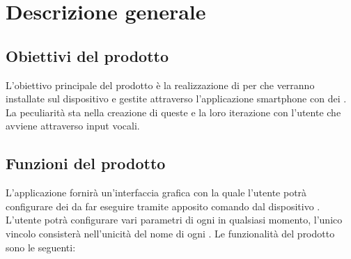 \clearpage
\section{Descrizione generale}
\subsection{Obiettivi del prodotto}
L'obiettivo principale del prodotto è la realizzazione di  per   che verranno installate sul dispositivo e gestite attraverso l'applicazione smartphone con dei . La peculiarità sta nella creazione di queste  e la loro iterazione con l'utente che avviene attraverso input vocali.
\subsection{Funzioni del prodotto}
L'applicazione fornirà un'interfaccia grafica con la quale l'utente potrà configurare dei  da far eseguire tramite apposito comando dal dispositivo  . L'utente potrà configurare vari parametri di ogni  in qualsiasi momento, l'unico vincolo consisterà nell'unicità del nome di ogni .
Le funzionalità del prodotto sono le seguenti: 
